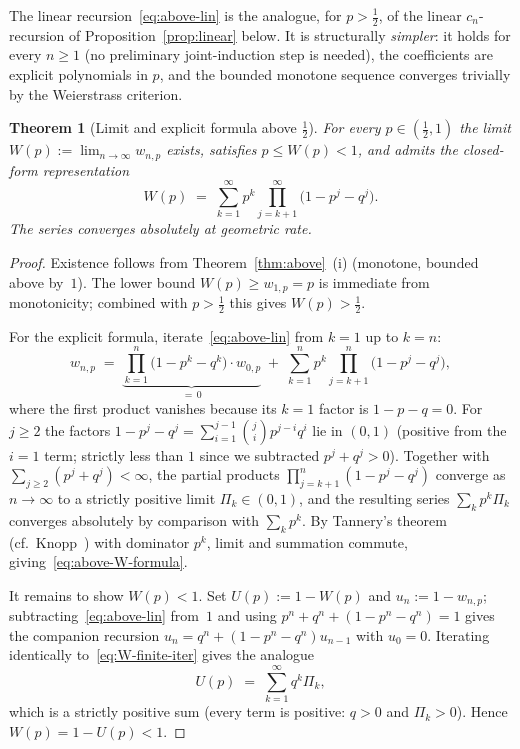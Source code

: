 \documentclass[reqno,final,11pt]{amsart}
\theoremstyle{plain}
\newtheorem{theorem}{Theorem}[section]
\theoremstyle{definition}
\theoremstyle{remark}
\begin{document}
The linear recursion~\eqref{eq:above-lin} is the analogue, for
$p>\tfrac12$, of the linear $c_n$-recursion of
Proposition~\ref{prop:linear} below.  It is structurally
\emph{simpler}: it holds for every $n\ge 1$ (no preliminary
joint-induction step is needed), the coefficients are explicit
polynomials in $p$, and the bounded monotone sequence converges
trivially by the Weierstrass criterion.

\begin{theorem}[Limit and explicit formula above $\tfrac12$]
  \label{thm:above-limit}
  For every $p\in(\tfrac12,1)$ the limit
  $W(p):=\lim_{n\to\infty}w_{n,p}$ exists, satisfies
  $p\le W(p)<1$, and admits the closed-form representation
  \begin{equation}\label{eq:above-W-formula}
    W(p) \;=\; \sum_{k=1}^\infty p^k\!\!\!\prod_{j=k+1}^\infty\!\!
            \bigl(1-p^j-q^j\bigr).
  \end{equation}
  The series converges absolutely at geometric rate.
\end{theorem}

\begin{proof}
  Existence follows from Theorem~\ref{thm:above}~(i) (monotone,
  bounded above by~$1$).  The lower bound $W(p)\ge w_{1,p}=p$ is
  immediate from monotonicity; combined with $p>\tfrac12$ this
  gives $W(p)>\tfrac12$.

  For the explicit formula, iterate~\eqref{eq:above-lin} from
  $k=1$ up to $k=n$:
  \begin{equation}\label{eq:W-finite-iter}
    w_{n,p} \;=\; \underbrace{\prod_{k=1}^n\!\bigl(1-p^k-q^k\bigr)
                               \cdot w_{0,p}}_{=\,0}
    \;+\; \sum_{k=1}^n p^k\!\prod_{j=k+1}^n\!\bigl(1-p^j-q^j\bigr),
  \end{equation}
  where the first product vanishes because its $k=1$ factor is
  $1-p-q=0$.  For $j\ge 2$ the factors
  $1-p^j-q^j=\sum_{i=1}^{j-1}\binom{j}{i}p^{j-i}q^i$ lie in $(0,1)$
  (positive from the $i=1$ term; strictly less than $1$ since we
  subtracted $p^j+q^j>0$).  Together with
  $\sum_{j\ge 2}(p^j+q^j)<\infty$, the partial products
  $\prod_{j=k+1}^n(1-p^j-q^j)$ converge as $n\to\infty$ to a
  strictly positive limit $\Pi_k\in(0,1)$, and the resulting
  series $\sum_k p^k\Pi_k$ converges absolutely by comparison with
  $\sum_k p^k$.  By Tannery's theorem
  (cf.\ Knopp~\citeyearpar[\S 41]{Knopp1990}) with dominator $p^k$, limit
  and summation commute, giving~\eqref{eq:above-W-formula}.

  It remains to show $W(p)<1$.  Set $U(p):=1-W(p)$ and
  $u_n:=1-w_{n,p}$; subtracting~\eqref{eq:above-lin} from~$1$ and
  using $p^n+q^n+(1-p^n-q^n)=1$ gives the companion recursion
  $u_n=q^n+(1-p^n-q^n)u_{n-1}$ with $u_0=0$.
  Iterating identically to~\eqref{eq:W-finite-iter} gives the
  analogue
  \[
    U(p) \;=\; \sum_{k=1}^\infty q^k\Pi_k,
  \]
  which is a strictly positive sum (every term is positive: $q>0$
  and $\Pi_k>0$).  Hence $W(p)=1-U(p)<1$.
\end{proof}
\end{document}
